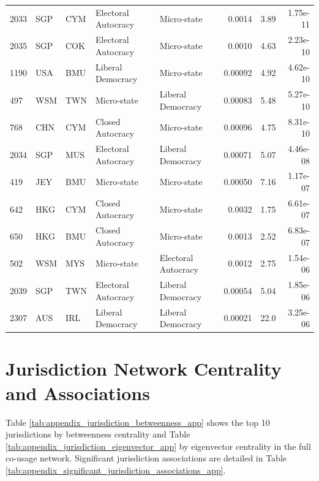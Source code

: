 {\begin{longtable}{@{}lllp{2.2cm}p{2.2cm}rrr@{}}
2033& SGP & CYM & Electoral Autocracy & Micro-state         & 0.0014   & 3.89      & 1.75e-11  \\
2035& SGP & COK & Electoral Autocracy & Micro-state         & 0.0010   & 4.63      & 2.23e-10  \\
1190& USA & BMU & Liberal Democracy   & Micro-state         & 0.00092  & 4.92      & 4.62e-10  \\
497 & WSM & TWN & Micro-state         & Liberal Democracy   & 0.00083  & 5.48      & 5.27e-10  \\
768 & CHN & CYM & Closed Autocracy    & Micro-state         & 0.00096  & 4.75      & 8.31e-10  \\
2034& SGP & MUS & Electoral Autocracy & Liberal Democracy   & 0.00071  & 5.07      & 4.46e-08  \\
419 & JEY & BMU & Micro-state         & Micro-state         & 0.00050  & 7.16      & 1.17e-07  \\
642 & HKG & CYM & Closed Autocracy    & Micro-state         & 0.0032   & 1.75      & 6.61e-07  \\
650 & HKG & BMU & Closed Autocracy    & Micro-state         & 0.0013   & 2.52      & 6.83e-07  \\
502 & WSM & MYS & Micro-state         & Electoral Autocracy & 0.0012   & 2.75      & 1.54e-06  \\
2039& SGP & TWN & Electoral Autocracy & Liberal Democracy   & 0.00054  & 5.04      & 1.85e-06  \\
2307& AUS & IRL & Liberal Democracy   & Liberal Democracy   & 0.00021  & 22.0      & 3.25e-06  \\
\end{longtable}
} 
\clearpage
\newpage


\section{Jurisdiction Network Centrality and Associations}
\label{sec:appendix_jurisdiction_network}

Table \ref{tab:appendix_jurisdiction_betweenness_app} shows the top 10 jurisdictions by betweenness centrality and Table \ref{tab:appendix_jurisdiction_eigenvector_app} by eigenvector centrality in the full co-usage network. Significant jurisdiction associations are detailed in Table \ref{tab:appendix_significant_jurisdiction_associations_app}.

